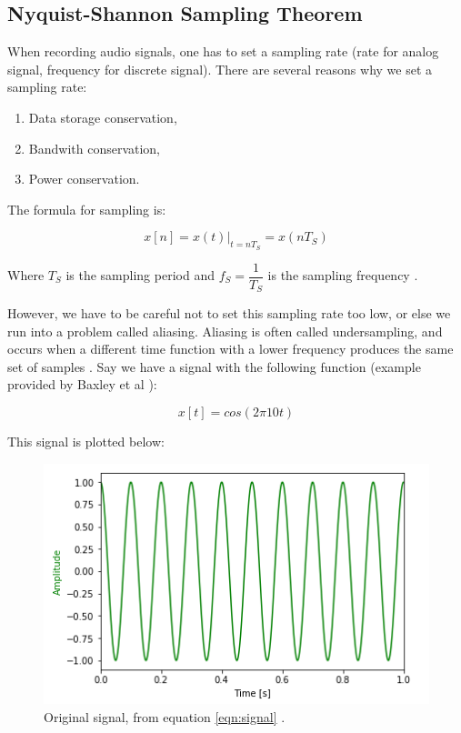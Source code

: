 \subsection{Nyquist-Shannon Sampling Theorem}
When recording audio signals, one has to set a sampling rate (rate for analog signal, frequency for discrete signal). There are several reasons why we set a sampling rate:
\begin{enumerate}
	\item Data storage conservation,
	\item Bandwith conservation,
	\item Power conservation.
\end{enumerate}

The formula for sampling is:

\begin{equation}
x[n]=x(t)|_{t=nT_{S}}=x(nT_{S})
\label{eqn:signal}
\end{equation}

Where \(T_{S}\) is the sampling period and \(f_{S}= \dfrac{1}{T_{S}}\) is the sampling frequency \cite{notes:class}.

However, we have to be careful not to set this sampling rate too low, or else we run into a problem called aliasing.  Aliasing is often called undersampling, and occurs when a different time function with a lower frequency produces the same set of samples \cite{aliase:wiki}. Say we have a signal with the following function (example provided by Baxley et al \cite{notebook:sampling}):

\begin{equation}
x[t]=cos(2\pi10t)
\end{equation}

This signal is plotted below:

\begin{figure}[H]
	\centering
	\includegraphics[scale = 1]{original_signal.png} %
	\caption{Original signal, from equation \ref{eqn:signal} \cite{notebook:sampling}.}
	\label{fig:signal_og}
\end{figure}    

